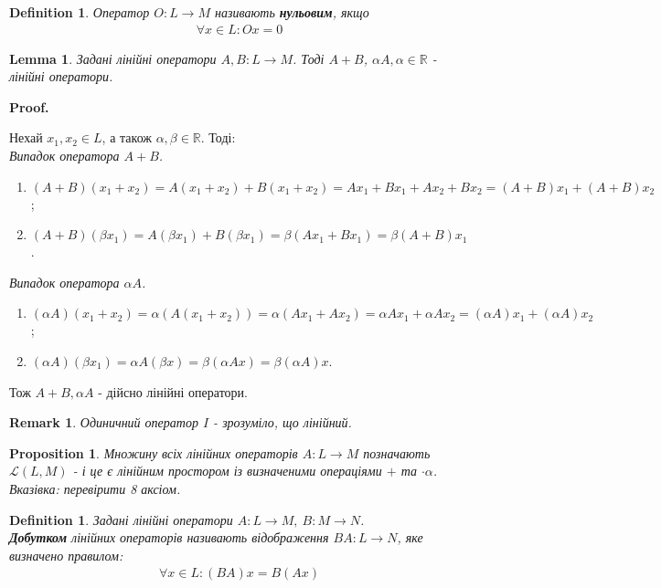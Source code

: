 \documentclass[a4paper, 10pt]{article}
\makeatletter
\theoremstyle{theoremdd}
\newtheorem{definition}[theorem]{Definition}
\newtheorem{proposition}[theorem]{Proposition}
\newtheorem{remark}[theorem]{Remark}
\newtheorem{lemma}[theorem]{Lemma}
\renewenvironment{proof}[1][Proof.\\]{\par
\pushQED{\hfill \qed}%
\normalfont \topsep6\p@\@plus6\p@\relax
\trivlist
\item\relax
{\bfseries
#1\@addpunct{.}}\hspace\labelsep\ignorespaces
}{%
\popQED\endtrivlist\@endpefalse
}
\makeatother
\begin{document}
	\begin{definition}
	Оператор $O \colon L \to M$ називають \textbf{нульовим}, якщо
	\begin{align*}
	\forall x \in L: Ox = 0
	\end{align*}
	\end{definition}
	
	\begin{lemma}
	Задані лінійні оператори $A,B \colon L \to M$. Тоді $A+B$, $\alpha A, \alpha \in \mathbb{R}$ - лінійні оператори.
	\end{lemma}
	
	\begin{proof}
	Нехай $x_1,x_2 \in L$, а також $\alpha,\beta \in \mathbb{R}$. Тоді:\\
	\textit{Випадок оператора $A+B$.}
	\begin{enumerate}[nosep, wide=0pt, label={\arabic*)}]
	\item $(A+B)(x_1+x_2) = A(x_1+x_2)+B(x_1+x_2)=Ax_1+Bx_1+Ax_2+Bx_2=(A+B)x_1 + (A+B)x_2$;
	\item $(A+B)(\beta x_1) = A(\beta x_1)+B(\beta x_1)=\beta (Ax_1+Bx_1) = \beta(A+B)x_1$.
	\end{enumerate}
	\noindent
	\textit{Випадок оператора $\alpha A$.}
	\begin{enumerate}[nosep, wide=0pt, label={\arabic*)}]
	\item $(\alpha A)(x_1+x_2) = \alpha(A(x_1+x_2))=\alpha(Ax_1 + Ax_2) = \alpha Ax_1 + \alpha Ax_2 = (\alpha A)x_1 + (\alpha A)x_2$;
	\item $(\alpha A) (\beta x_1) = \alpha A(\beta x) = \beta(\alpha Ax) = \beta (\alpha A)x$.
	\end{enumerate}
	\noindent
	Тож $A+B, \alpha A$ - дійсно лінійні оператори.
	\end{proof}
	
	\begin{remark}
	Одиничний оператор $I$ - зрозуміло, що лінійний.
	\end{remark}
	
	\begin{proposition}
	Множину всіх лінійних операторів $A \colon L \to M$ позначають $\mathcal{L}(L,M)$ - і це є лінійним простором із визначеними операціями $+$ та $\cdot \alpha$.\\
	\textit{Вказівка: перевірити 8 аксіом.}
	\end{proposition}
	
	\begin{definition}
	Задані лінійні оператори $A \colon L \to M,\ B \colon M \to N$.\\
	\textbf{Добутком} лінійних операторів називають відображення $BA \colon L \to N$, яке визначено правилом:
	\begin{align*}
	\forall x \in L: (BA)x = B(Ax)
	\end{align*}
	\end{definition}
	
\end{document}
